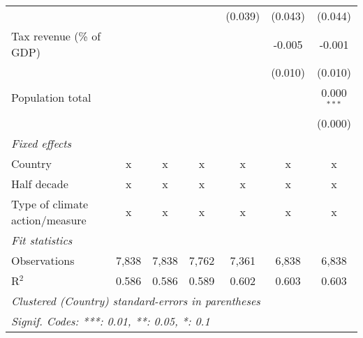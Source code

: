 \begin{tabular}{lcccccc}
                                                      &             &               &                & (0.039)        & (0.043)        & (0.044)\\   
   Tax revenue (\% of GDP)                            &             &               &                &                & -0.005         & -0.001\\   
                                                      &             &               &                &                & (0.010)        & (0.010)\\   
   Population total                                   &             &               &                &                &                & 0.000$^{***}$\\   
                                                      &             &               &                &                &                & (0.000)\\   
   \emph{Fixed effects}\\
   Country                                            & x           & x             & x              & x              & x              & x\\  
   Half decade                                        & x           & x             & x              & x              & x              & x\\  
   Type of climate action/measure                     & x           & x             & x              & x              & x              & x\\  
   \midrule \emph{Fit statistics}\\
   Observations                                       & 7,838       & 7,838         & 7,762          & 7,361          & 6,838          & 6,838\\  
   R$^2$                                              & 0.586       & 0.586         & 0.589          & 0.602          & 0.603          & 0.603\\  
   \midrule
   \multicolumn{7}{l}{\emph{Clustered (Country) standard-errors in parentheses}}\\
   \multicolumn{7}{l}{\emph{Signif. Codes: ***: 0.01, **: 0.05, *: 0.1}}\\
\end{tabular}
\par\endgroup


